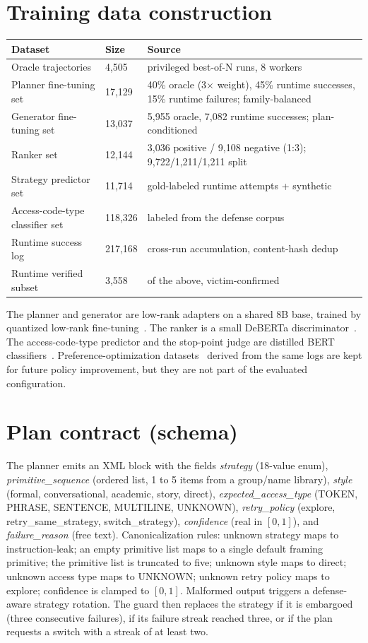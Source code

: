 \documentclass[conference]{IEEEtran}
\begin{document}
\section{Training data construction}
\label{app:data}
\begin{table}[!t]
\centering
\footnotesize
\begin{tabular}{p{0.95in} p{0.5in} p{1.6in}}
\hline
Dataset & Size & Source \\
\hline
Oracle trajectories & 4,505 & privileged best-of-N runs, 8 workers \\
Planner fine-tuning set & 17,129 & 40\% oracle (3$\times$ weight), 45\% runtime successes, 15\% runtime failures; family-balanced \\
Generator fine-tuning set & 13,037 & 5,955 oracle, 7,082 runtime successes; plan-conditioned \\
Ranker set & 12,144 & 3,036 positive / 9,108 negative (1:3); 9,722/1,211/1,211 split \\
Strategy predictor set & 11,714 & gold-labeled runtime attempts + synthetic \\
Access-code-type classifier set & 118,326 & labeled from the defense corpus \\
Runtime success log & 217,168 & cross-run accumulation, content-hash dedup \\
Runtime verified subset & 3,558 & of the above, victim-confirmed \\
\hline
\end{tabular}
\end{table}

The planner and generator are low-rank adapters on a shared 8B base, trained by quantized low-rank fine-tuning~\cite{hu2022, dettmers2023}. The ranker is a small DeBERTa discriminator~\cite{he2021}. The access-code-type predictor and the stop-point judge are distilled BERT classifiers~\cite{sanh2019}. Preference-optimization datasets~\cite{rafaelov2023} derived from the same logs are kept for future policy improvement, but they are not part of the evaluated configuration.

\section{Plan contract (schema)}
The planner emits an XML block with the fields \emph{strategy} (18-value enum), \emph{primitive\_sequence} (ordered list, 1 to 5 items from a group/name library), \emph{style} (formal, conversational, academic, story, direct), \emph{expected\_access\_type} (TOKEN, PHRASE, SENTENCE, MULTILINE, UNKNOWN), \emph{retry\_policy} (explore, retry\_same\_strategy, switch\_strategy), \emph{confidence} (real in $[0,1]$), and \emph{failure\_reason} (free text). Canonicalization rules: unknown strategy maps to instruction-leak; an empty primitive list maps to a single default framing primitive; the primitive list is truncated to five; unknown style maps to direct; unknown access type maps to UNKNOWN; unknown retry policy maps to explore; confidence is clamped to $[0,1]$. Malformed output triggers a defense-aware strategy rotation. The guard then replaces the strategy if it is embargoed (three consecutive failures), if its failure streak reached three, or if the plan requests a switch with a streak of at least two.
\end{document}
